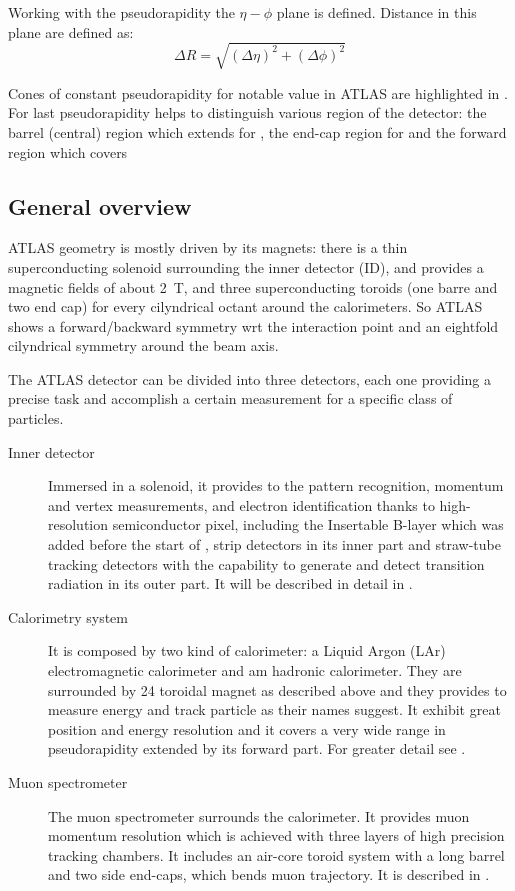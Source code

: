 Working with the pseudorapidity the $\eta	-\phi$ plane is defined. Distance in this plane are defined as:
\begin{equation}
	\Delta R=\sqrt{\left(\Delta \eta \right)^2 + \left(\Delta \phi \right)^2}
\end{equation}

Cones of constant pseudorapidity for notable value in ATLAS are highlighted in \Fig{\ref{fig:pseudorapidita}}. For last pseudorapidity helps to distinguish various region of the detector: the barrel (central) region which extends for , the  end-cap region for  and the forward region which covers 




\subsection{General overview}
ATLAS geometry is mostly driven by its magnets: there is a thin superconducting solenoid surrounding the inner detector (ID), and provides a magnetic fields of about \SI{2}{\tesla}, and three superconducting toroids (one barre and two end cap) for every cilyndrical octant around the calorimeters. So ATLAS shows a forward/backward symmetry wrt the interaction point and an eightfold cilyndrical symmetry around the beam axis.

The ATLAS detector can be divided into three detectors, each one providing a precise task and accomplish a certain measurement for a specific class of particles.
\begin{description}
\item[Inner detector] Immersed in a solenoid, it provides to the pattern recognition, momentum and vertex measurements, and electron identification thanks to high-resolution semiconductor pixel, including the Insertable B-layer which was added before the start of \RunTwo, strip detectors in its inner part and straw-tube tracking detectors with the capability to generate and detect transition radiation in its outer part. It will be described in detail in \Sect{\ref{sec:ID}}.
\item[Calorimetry system] It is composed by two kind of calorimeter: a Liquid Argon (LAr) electromagnetic calorimeter and am hadronic calorimeter. They are surrounded by \num{24} toroidal magnet as described above and they provides to measure energy and track particle as their names suggest. It exhibit great position and energy resolution and it covers a very wide range in pseudorapidity extended by its forward part. For greater detail see \Sect{\ref{sec:calo}}.
\item[Muon spectrometer] The muon spectrometer surrounds the calorimeter. It provides muon momentum resolution which is achieved with three layers of high precision tracking chambers. It includes an air-core toroid system with a long barrel and two side end-caps, which bends muon trajectory. It is described in \Sect{\ref{sec:muons}}.

\end{description}

